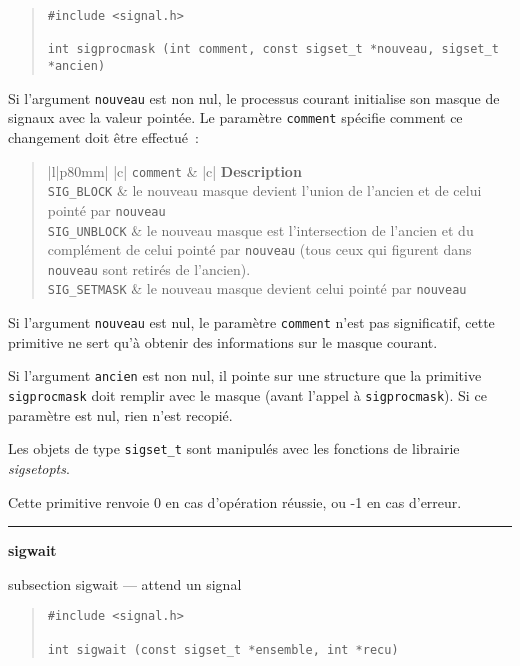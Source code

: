 \documentclass [twoside] {report}
\newcommand {\primitive} [1]
    {
	{\large \bf #1}
	\addcontentsline {toc} {subsection} {#1}
    }
\newcommand {\separation}
    {
	\vspace {7mm}
	\nopagebreak
	\hrule
    }
\begin{document}
\begin {quote}
\begin {verbatim}
#include <signal.h>

int sigprocmask (int comment, const sigset_t *nouveau, sigset_t *ancien)
\end{verbatim}
\end {quote}

Si l'argument {\tt nouveau} est non nul, le processus courant initialise
son masque de signaux avec la valeur pointée. Le paramètre {\tt comment}
spécifie comment ce changement doit être effectué~:

\begin {quote}
\begin {tabular} {|l|p{80mm}|} \hline
     {|c|} {\tt comment}
	&  {|c|} {\bf Description}
	\\ \hline
    \verb:SIG_BLOCK:
	& le nouveau masque devient l'union de l'ancien et de celui pointé
	    par {\tt nouveau}
	\\ \hline
    \verb:SIG_UNBLOCK:
	& le nouveau masque est l'intersection de l'ancien et du
	    complément de celui pointé par {\tt nouveau} (tous ceux qui
	    figurent dans {\tt nouveau} sont retirés de l'ancien).
	\\ \hline
    \verb:SIG_SETMASK:
	& le nouveau masque devient celui pointé par {\tt nouveau}
	\\ \hline
\end {tabular}
\end {quote}

Si l'argument {\tt nouveau} est nul, le paramètre {\tt comment}
n'est pas significatif, cette primitive ne sert qu'à obtenir des
informations sur le masque courant.

Si l'argument {\tt ancien} est non nul, il pointe sur une structure que
la primitive {\tt sigprocmask} doit remplir avec le masque (avant
l'appel à {\tt sigprocmask}).  Si ce paramètre est nul, rien n'est
recopié.

Les objets de type {\tt sigset\_t} sont manipulés avec les fonctions de
librairie {\em sigsetopts}.

Cette primitive renvoie 0 en cas d'opération réussie, ou -1 en cas
d'erreur.



\separation
\primitive {sigwait} --- attend un signal
    \label {sigwait}

\begin {quote}
\begin {verbatim}
#include <signal.h>

int sigwait (const sigset_t *ensemble, int *recu)
\end{verbatim}
\end {quote}
\end{document}
